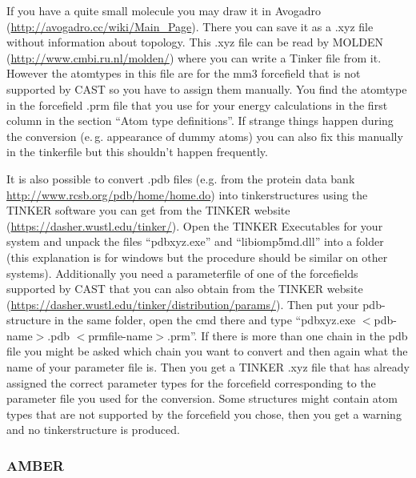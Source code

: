 \documentclass[10pt,a4paper]{article} %
\begin{document}
	If you have a quite small molecule you may draw it in Avogadro (\url{http://avogadro.cc/wiki/Main_Page}). There you can save it as a .xyz file without information about topology. This .xyz file can be read by MOLDEN (\url{http://www.cmbi.ru.nl/molden/}) where you can write a Tinker file from it. However the atomtypes in this file are for the mm3 forcefield that is not supported by \ac{CAST} so you have to assign them manually. You find the atomtype in the forcefield .prm file that you use for your energy calculations in the first column in the section ``Atom type definitions''. If strange things happen during the conversion (e.\,g. appearance of dummy atoms) you can also fix this manually in the tinkerfile but this shouldn't happen frequently.
	
	It is also possible to convert .pdb files (e.g. from the protein data bank \url{http://www.rcsb.org/pdb/home/home.do}) into tinkerstructures using the TINKER software you can get from the TINKER website (\url{https://dasher.wustl.edu/tinker/}). Open the TINKER Executables for your system and unpack the files ``pdbxyz.exe'' and ``libiomp5md.dll'' into a folder (this explanation is for windows but the procedure should be similar on other systems). Additionally you need a parameterfile of one of the forcefields supported by \ac{CAST} that you can also obtain from the TINKER website (\url{https://dasher.wustl.edu/tinker/distribution/params/}). Then put your pdb-structure in the same folder, open the cmd there and type ``pdbxyz.exe $<$pdb-name$>$.pdb $<$prmfile-name$>$.prm''. If there is more than one chain in the pdb file you might be asked which chain you want to convert and then again what the name of your parameter file is. Then you get a TINKER .xyz file that has already assigned the correct parameter types for the forcefield corresponding to the parameter file you used for the conversion. Some structures might contain atom types that are not supported by the forcefield you chose, then you get a warning and no tinkerstructure is produced.
	
	\subsubsection{AMBER}
\end{document}
